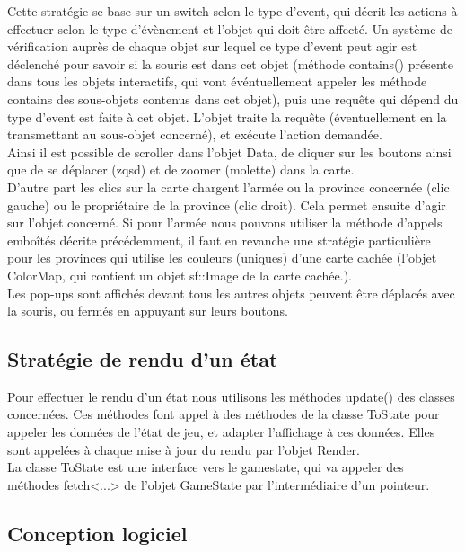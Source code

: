 \documentclass[a4paper,12pt]{article}
\begin{document}
Cette stratégie se base sur un switch selon le type d'event, qui décrit les actions à effectuer selon le type d'évènement et l'objet qui doit être affecté. Un système de vérification auprès de chaque objet sur lequel ce type d'event peut agir est déclenché pour savoir si la souris est dans cet objet (méthode contains() présente dans tous les objets interactifs, qui vont événtuellement appeler les méthode contains des sous-objets contenus dans cet objet), puis une requête qui dépend du type d'event est faite à cet objet. L'objet traite la requête (éventuellement en la transmettant au sous-objet concerné), et exécute l'action demandée.\\

Ainsi il est possible de scroller dans l'objet Data, de cliquer sur les boutons ainsi que de se déplacer (zqsd) et de zoomer (molette) dans la carte.\\

D'autre part les clics sur la carte chargent l'armée ou la province concernée (clic gauche) ou le propriétaire de la province (clic droit). Cela permet ensuite d'agir sur l'objet concerné. Si pour l'armée nous pouvons utiliser la méthode d'appels emboîtés décrite précédemment, il faut en revanche une stratégie particulière pour les provinces qui utilise les couleurs (uniques) d'une carte cachée (l'objet ColorMap, qui contient un objet sf::Image de la carte cachée.).\\

Les pop-ups sont affichés devant tous les autres objets peuvent être déplacés avec la souris, ou fermés en appuyant sur leurs boutons.\\

\subsection{Stratégie de rendu d'un état}
Pour effectuer le rendu d'un état nous utilisons les méthodes update() des classes concernées. Ces méthodes font appel à des méthodes de la classe ToState pour appeler les données de l'état de jeu, et adapter l'affichage à ces données. Elles sont appelées à chaque mise à jour du rendu par l'objet Render.\\

La classe ToState est une interface vers le gamestate, qui va appeler des méthodes fetch<...> de l'objet GameState par l'intermédiaire d'un pointeur.\\   

\subsection{Conception logiciel}
\end{document}

